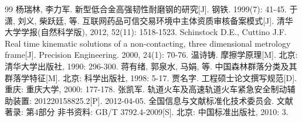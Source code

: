 
\renewcommand\refname{参考文献}


\begin{thebibliography}{99}
\setlength{\itemsep}{0pt}
 杨瑞林, 李力军. 新型低合金高强韧性耐磨钢的研究[J]. 钢铁. 1999(7): 41-45.
 于潇, 刘义, 柴跃廷, 等. 互联网药品可信交易环境中主体资质审核备案模式[J]. 清华大学学报(自然科学版), 2012, 52(11): 1518-1523.
 Schinstock D.E., Cuttino J.F. Real time kinematic solutions of a non-contacting, three dimensional metrology frame[J]. Precision Engineering. 2000, 24(1): 70-76.
 温诗铸. 摩擦学原理[M]. 北京: 清华大学出版社, 1990: 296-300.
 蒋有绪, 郭泉水, 马娟, 等. 中国森林群落分类及其群落学特征[M]. 北京: 科学出版社, 1998: 5-17.
 贾名字. 工程硕士论文撰写规范[D]. 重庆: 重庆大学, 2000: 177-178.
 张凯军. 轨道火车及高速轨道火车紧急安全制动辅助装置: 201220158825.2[P]. 2012-04-05.
 全国信息与文献标准化技术委员会. 文献著录: 第4部分 非书资料: GB/T 3792.4-2009[S]. 北京: 中国标准出版社, 2010: 3.
\end{thebibliography}
